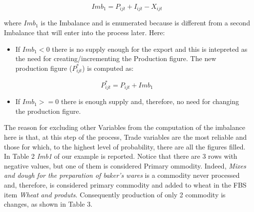 \documentclass[]{article}
\providecommand{\tightlist}{%
  \setlength{\itemsep}{0pt}\setlength{\parskip}{0pt}}
\begin{document}
\begin{equation}
\label{imbalance1}
Imb_{1} = P_{ijt} + I_{ijt} - X_{ijt}
\end{equation}

where \(Imb_{1}\) is the Imbalance and is enumerated because is
different from a second Imbalance that will enter into the process
later. Here:

\begin{itemize}
\tightlist
\item
  If \(Imb_{1} < 0\) there is no supply enough for the export and this
  is intepreted as the need for creating/incrementing the Production
  figure. The new production figure (\(P^*_{ijt}\)) is computed as:
\end{itemize}

\begin{equation}
\label{imbalance1}
 P^*_{ijt} = P_{ijt} + Imb_{1}
\end{equation}

\begin{itemize}
\tightlist
\item
  If \(Imb_{1} >= 0\) there is enough supply and, therefore, no need for
  changing the production figure.
\end{itemize}

The reason for excluding other Variables from the computation of the
imbalance here is that, at this step of the process, Trade variables are
the most reliable and those for which, to the highest level of
probability, there are all the figures filled. In Table 2 \emph{Imb1} of
our example is reported. Notice that there are 3 rows with negative
values, but one of them is considered Primary ommodity. Indeed,
\emph{Mixes and dough for the preparation of baker's wares} is a
commodity never processed and, therefore, is considered primary
commodity and added to wheat in the FBS item \emph{Wheat and produts}.
Consequently production of only 2 commodity is changes, as shown in
Table 3.
\end{document}
